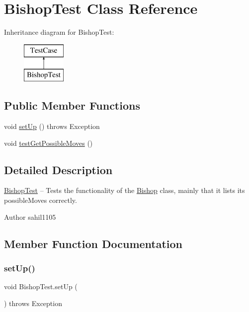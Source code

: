 \hypertarget{class_bishop_test}{}\section{Bishop\+Test Class Reference}
\label{class_bishop_test}
Inheritance diagram for Bishop\+Test\+:\begin{figure}[H]
\begin{center}
\leavevmode
\includegraphics[height=2.000000cm]{class_bishop_test}
\end{center}
\end{figure}
\subsection*{Public Member Functions}
\begin{DoxyCompactItemize}
\item 
void \mbox{\hyperlink{class_bishop_test_af472267773a26578149907fff066a862}{set\+Up}} ()  throws Exception 
\item 
void \mbox{\hyperlink{class_bishop_test_a94f3b145a95a29033d1df0a4a504cd06}{test\+Get\+Possible\+Moves}} ()
\end{DoxyCompactItemize}


\subsection{Detailed Description}
\mbox{\hyperlink{class_bishop_test}{Bishop\+Test}} -- Tests the functionality of the \mbox{\hyperlink{class_bishop}{Bishop}} class, mainly that it lists its possible\+Moves correctly. \begin{DoxyAuthor}{Author}
sahil1105 
\end{DoxyAuthor}


\subsection{Member Function Documentation}
\mbox{\label{class_bishop_test_af472267773a26578149907fff066a862}} 
\subsubsection{\texorpdfstring{set\+Up()}{setUp()}}
{\footnotesize\ttfamily void Bishop\+Test.\+set\+Up (\begin{DoxyParamCaption}{ }\end{DoxyParamCaption}) throws Exception}

